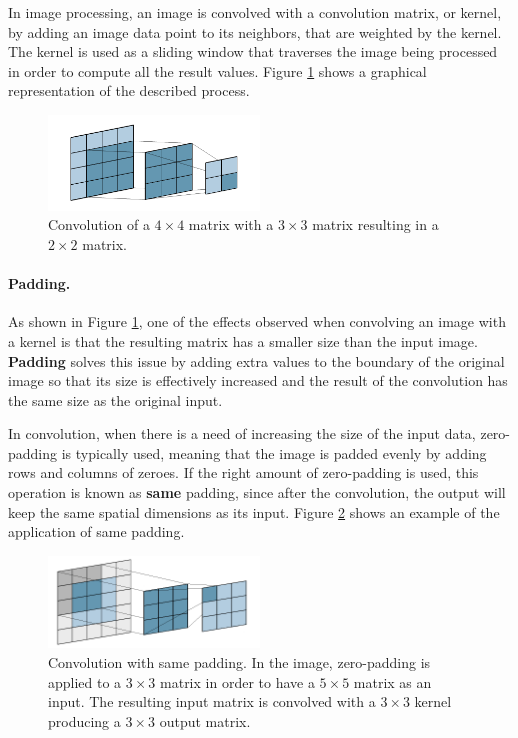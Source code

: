 In image processing, an image is convolved with a convolution matrix, or kernel, by adding an image data point to its neighbors, that are weighted by the kernel. The kernel is used as a sliding window that traverses the image being processed in order to compute all the result values. Figure \ref{fig:convolution} shows a graphical representation of the described process.

\begin{figure}
	\centering
	\includegraphics[width=0.5\textwidth]{images/convolution.png}
	\caption{Convolution of a $4\times4$ matrix with a $3\times3$ matrix resulting in a $2\times2$ matrix.}
	\label{fig:convolution}
\end{figure}

\paragraph{Padding.}
As shown in Figure \ref{fig:convolution}, one of the effects observed when convolving an image with a kernel is that the resulting matrix has a smaller size than the input image. \textbf{Padding} solves this issue by adding extra values to the boundary of the original image so that its size is effectively increased and the result of the convolution has the same size as the original input.

In convolution, when there is a need of increasing the size of the input data, zero-padding is typically used, meaning that the image is padded evenly by adding rows and columns of zeroes. If the right amount of zero-padding is used, this operation is known as \textbf{same} padding, since after the convolution, the output will keep the same spatial dimensions as its input. Figure \ref{fig:padding} shows an example of the application of same padding.

\begin{figure}
	\centering
	\includegraphics[width=0.5\textwidth]{images/padding.png}
	\caption{Convolution with same padding. In the image, zero-padding is applied to a $3\times3$ matrix in order to have a $5\times5$ matrix as an input. The resulting input matrix is convolved with a $3\times3$ kernel producing a $3\times3$ output matrix.}
	\label{fig:padding}
\end{figure}

